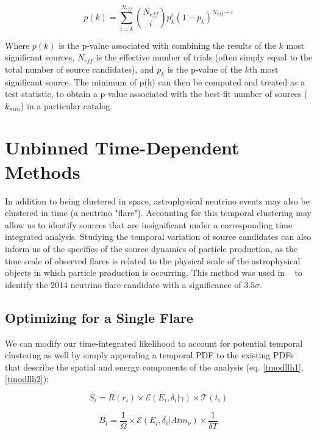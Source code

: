 \begin{equation}
    p(k) = \sum_{i=k}^{N_{eff}} \binom{N_{eff}}{i}p_k^i(1-p_k)^{N_{eff}-i}
    \label{bitest}
\end{equation}

Where $p(k)$ is the p-value associated with combining the results of the $k$ most significant sources, $N_{eff}$ is the effective number of trials (often simply equal to the total number of source candidates), and $p_k$ is the p-value of the $k$th most significant source. The minimum of p(k) can then be computed and treated as a test statistic, to obtain a p-value associated with the best-fit number of sources ($k_{min}$) in a particular catalog. 


\section{Unbinned Time-Dependent Methods}
In addition to being clustered in space, astrophysical neutrino events may also be clustered in time (a neutrino "flare"). Accounting for this temporal clustering may allow us to identify sources that are insignificant under a corresponding time integrated analysis. Studying the temporal variation of source candidates can also inform us of the specifics of the source dynamics of particle production, as the time scale of observed flares is related to the physical scale of the astrophysical objects in which particle production is occurring. This method was used in ~\cite{txs_archival} to identify the 2014 neutrino flare candidate with a significance of $3.5 \sigma$. 

\subsection{Optimizing for a Single Flare}
We can modify our time-integrated likelihood to account for potential temporal clustering as well by simply appending a temporal PDF to the existing PDFs that describe the spatial and energy components of the analysis (eq. \ref{tmodllh1}, \ref{tmodllh2}):

\begin{equation}
    S_i = R(r_i) \times \mathcal{E}(E_i, \delta_i|\gamma) \times \mathcal{T}(t_i)
    \label{tmodllh1}
\end{equation}

\begin{equation}
    B_i = \frac{1}{\Omega}\times \mathcal{E}(E_i,\delta_i|Atm_{\nu}) \times \frac{1}{\delta T}
    \label{tmodllh2}
\end{equation}


